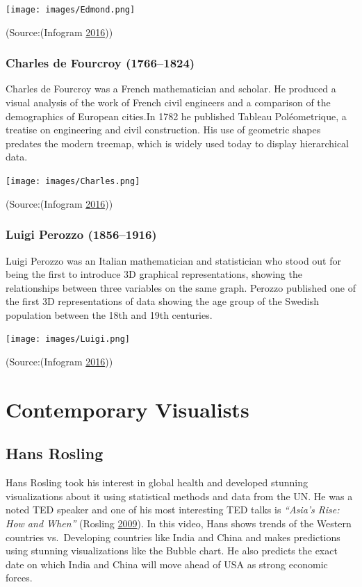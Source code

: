 \documentclass[]{book}
\begin{document}
\texttt{[image: images/Edmond.png]}

(Source:(Infogram \protect\hyperlink{ref-history_viz}{2016}))

\hypertarget{charles-de-fourcroy-17661824}{%
\subsubsection{Charles de Fourcroy (1766--1824)}\label{charles-de-fourcroy-17661824}}

Charles de Fourcroy was a French mathematician and scholar. He produced a visual analysis of the work of French civil engineers and a comparison of the demographics of European cities.In 1782 he published Tableau Poléometrique, a treatise on engineering and civil construction. His use of geometric shapes predates the modern treemap, which is widely used today to display hierarchical data.

\texttt{[image: images/Charles.png]}

(Source:(Infogram \protect\hyperlink{ref-history_viz}{2016}))

\hypertarget{luigi-perozzo-18561916}{%
\subsubsection{Luigi Perozzo (1856--1916)}\label{luigi-perozzo-18561916}}

Luigi Perozzo was an Italian mathematician and statistician who stood out for being the first to introduce 3D graphical representations, showing the relationships between three variables on the same graph. Perozzo published one of the first 3D representations of data showing the age group of the Swedish population between the 18th and 19th centuries.

\texttt{[image: images/Luigi.png]}

(Source:(Infogram \protect\hyperlink{ref-history_viz}{2016}))

\hypertarget{contemporary-visualists}{%
\section{Contemporary Visualists}\label{contemporary-visualists}}

\hypertarget{hans-rosling}{%
\subsection{Hans Rosling}\label{hans-rosling}}

Hans Rosling took his interest in global health and developed stunning visualizations about it using statistical methods and data from the UN. He was a noted TED speaker and one of his most interesting TED talks is \emph{``Asia's Rise: How and When''} (Rosling \protect\hyperlink{ref-hans}{2009}). In this video, Hans shows trends of the Western countries vs.~Developing countries like India and China and makes predictions using stunning visualizations like the Bubble chart. He also predicts the exact date on which India and China will move ahead of USA as strong economic forces.
\end{document}
